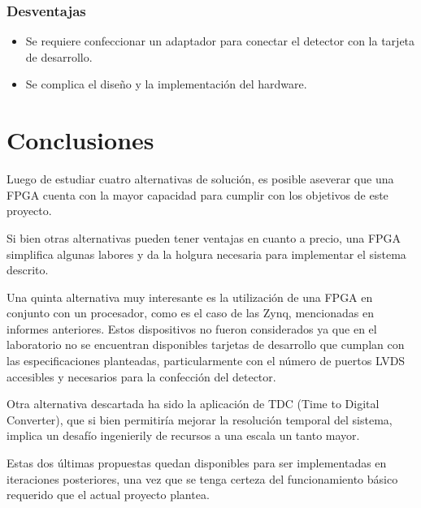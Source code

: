 \subsubsection*{Desventajas}
\begin{itemize}
	\item Se requiere confeccionar un adaptador para conectar el detector con la tarjeta de desarrollo.
	\item Se complica el diseño y la implementación del hardware.
\end{itemize}




\newpage
\section{Conclusiones}
\par Luego de estudiar cuatro alternativas de solución, es posible aseverar que una FPGA cuenta con la mayor capacidad para cumplir con los objetivos de este proyecto.
\par Si bien otras alternativas pueden tener ventajas en cuanto a precio, una FPGA simplifica algunas labores y da la holgura necesaria para implementar el sistema descrito.
\par Una quinta alternativa muy interesante es la utilización de una FPGA en conjunto con un procesador, como es el caso de las Zynq, mencionadas en informes anteriores. Estos dispositivos no fueron considerados ya que en el laboratorio no se encuentran disponibles tarjetas de desarrollo que cumplan con las especificaciones planteadas, particularmente con el número de puertos LVDS accesibles y necesarios para la confección del detector.
\par Otra alternativa descartada ha sido la aplicación de TDC (Time to Digital Converter)\cite{Arpin2010AResources}, que si bien permitiría mejorar la resolución temporal del sistema, implica un desafío ingenierily de recursos a una escala un tanto mayor.
\par Estas dos últimas propuestas quedan disponibles para ser implementadas en iteraciones posteriores, una vez que se tenga certeza del funcionamiento básico requerido que el actual proyecto plantea.
